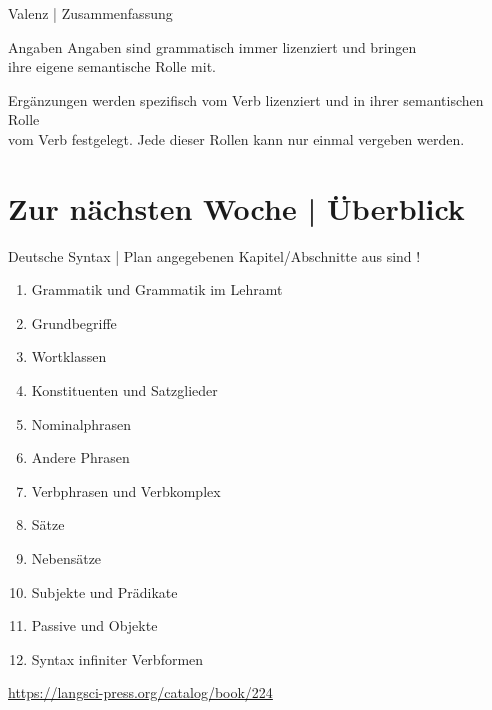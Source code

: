 \begin{frame}
  {Valenz | Zusammenfassung}
  \onslide<+->
  \onslide<+->
  \begin{block}{Angaben}
    \alert{Angaben} sind grammatisch immer lizenziert und bringen\\
    ihre eigene semantische Rolle mit.\\
    \Halbzeile
  \end{block}
  \Zeile
  \onslide<+->
  \begin{block}{Ergänzungen}
     werden spezifisch vom Verb lizenziert und in ihrer semantischen Rolle\\
    vom Verb festgelegt. Jede dieser Rollen kann nur einmal vergeben werden.
  \end{block}
\end{frame}




\section{Zur nächsten Woche | Überblick}

\begin{frame}
  {Deutsche Syntax | Plan}
   angegebenen Kapitel\slash Abschnitte aus  sind !\\
  \Halbzeile
  \begin{enumerate}
    \item Grammatik und Grammatik im Lehramt 
    \item Grundbegriffe 
    \item \alert{Wortklassen} 
    \item Konstituenten und Satzglieder 
    \item Nominalphrasen 
    \item Andere Phrasen 
    \item Verbphrasen und Verbkomplex 
    \item Sätze  
    \item Nebensätze 
    \item Subjekte und Prädikate 
    \item Passive und Objekte 
    \item Syntax infiniter Verbformen 
  \end{enumerate}
  \Halbzeile
  \centering 
  \url{https://langsci-press.org/catalog/book/224}
\end{frame}


